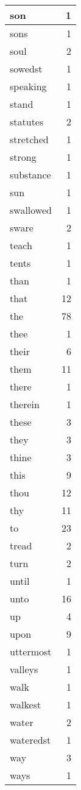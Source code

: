 \begin{center}
\begin{longtable}{l|r}
son & 1 \\ \hline
sons & 1 \\ \hline
soul & 2 \\ \hline
sowedst & 1 \\ \hline
speaking & 1 \\ \hline
stand & 1 \\ \hline
statutes & 2 \\ \hline
stretched & 1 \\ \hline
strong & 1 \\ \hline
substance & 1 \\ \hline
sun & 1 \\ \hline
swallowed & 1 \\ \hline
sware & 2 \\ \hline
teach & 1 \\ \hline
tents & 1 \\ \hline
than & 1 \\ \hline
that & 12 \\ \hline
the & 78 \\ \hline
thee & 1 \\ \hline
their & 6 \\ \hline
them & 11 \\ \hline
there & 1 \\ \hline
therein & 1 \\ \hline
these & 3 \\ \hline
they & 3 \\ \hline
thine & 3 \\ \hline
this & 9 \\ \hline
thou & 12 \\ \hline
thy & 11 \\ \hline
to & 23 \\ \hline
tread & 2 \\ \hline
turn & 2 \\ \hline
until & 1 \\ \hline
unto & 16 \\ \hline
up & 4 \\ \hline
upon & 9 \\ \hline
uttermost & 1 \\ \hline
valleys & 1 \\ \hline
walk & 1 \\ \hline
walkest & 1 \\ \hline
water & 2 \\ \hline
wateredst & 1 \\ \hline
way & 3 \\ \hline
ways & 1 \\ \hline

\end{longtable}
\end{center}
